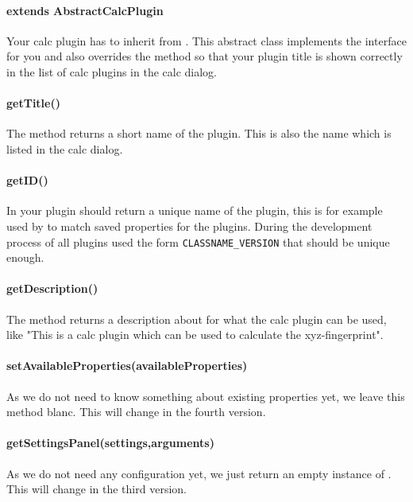     \paragraph{extends AbstractCalcPlugin}
    Your calc plugin has to inherit from .
    This abstract class implements the  interface
    for you and also overrides the  method so that your plugin title
    is shown correctly in the list of calc plugins in the calc dialog.

    \paragraph{getTitle()}
    The  method returns a short name of the plugin.
    This is also the name which is listed in the calc dialog.

    \paragraph{getID()}
    In  your plugin should return a unique name of the plugin,
    this is for example used by \sh to match saved properties for the plugins.
    During the development process of \sh all plugins used
    the form \verb+CLASSNAME_VERSION+ that should be unique enough.

    \paragraph{getDescription()}
    The  method returns a description
    about for what the calc plugin can be used,
    like "This is a calc plugin which can be used to calculate the xyz-fingerprint".

    \paragraph{setAvailableProperties(availableProperties)}
    As we do not need to know something about existing properties yet,
    we leave this method blanc.
    This will change in the fourth version.

    \paragraph{getSettingsPanel(settings,arguments)}
    As we do not need any configuration yet,
    we just return an empty instance of .
    This will change in the third version.

